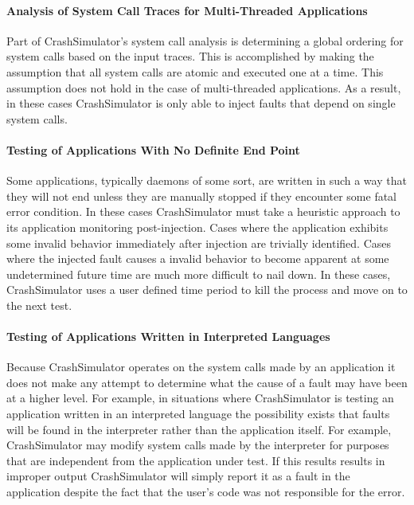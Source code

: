         \paragraph{Analysis of System Call Traces for Multi-Threaded Applications}

            Part of CrashSimulator's system call analysis is determining a global ordering for system calls based on the
            input traces. This is accomplished by making the assumption that all system calls are atomic and executed
            one at a time. This assumption does not hold in the case of multi-threaded applications. As a result, in
            these cases CrashSimulator is only able to inject faults that depend on single system calls.

        \paragraph{Testing of Applications With No Definite End Point}

            Some applications, typically daemons of some sort, are written in such a way that they will not end unless
            they are manually stopped if they encounter some fatal error condition. In these cases CrashSimulator must
            take a heuristic approach to its application monitoring post-injection. Cases where the application exhibits
            some invalid behavior immediately after injection are trivially identified. Cases where the injected fault
            causes a invalid behavior to become apparent at some undetermined future time are much more difficult to
            nail down. In these cases, CrashSimulator uses a user defined time period to kill the process and move on to
            the next test.

        \paragraph{Testing of Applications Written in Interpreted Languages}

            Because CrashSimulator operates on the system calls made by an application it does not make any attempt to
            determine what the cause of a fault may have been at a higher level. For example, in situations where
            CrashSimulator is testing an application written in an interpreted language the possibility exists that
            faults will be found in the interpreter rather than the application itself. For example, CrashSimulator may
            modify system calls made by the interpreter for purposes that are independent from the application under
            test.  If this results results in improper output CrashSimulator will simply report it as a fault in the
            application despite the fact that the user's code was not responsible for the error.

